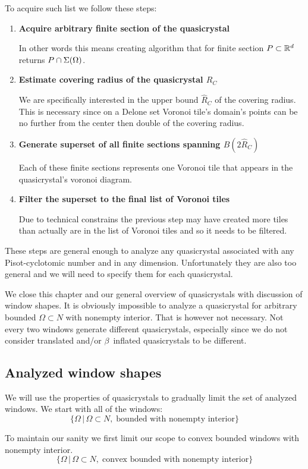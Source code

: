 \documentclass[text.tex]{subfiles}
\begin{document}
To acquire such list we follow these steps: 
\begin{enumerate}
\item \textbf{Acquire arbitrary finite section of the quasicrystal}

In other words this means creating algorithm that for finite section $P\subset\mathbb{R}^d$ returns $P\cap\Sigma(\Omega)$. 
\item \textbf{Estimate covering radius of the quasicrystal $R_C$}

We are specifically interested in the upper bound $\hat{R}_C$ of the covering radius. This is necessary since on a Delone set Voronoi tile's domain's points can be no further from the center then double of the covering radius. 
\item \textbf{Generate superset of all finite sections spanning $B(2\hat{R}_C)$}

Each of these finite sections represents one Voronoi tile that appears in the quasicrystal's voronoi diagram. 
\item \textbf{Filter the superset to the final list of Voronoi tiles}

Due to technical constrains the previous step may have created more tiles than actually are in the list of Voronoi tiles and so it needs to be filtered. 
\end{enumerate}

These steps are general enough to analyze any quasicrystal associated with any Pisot-cyclotomic number and in any dimension. Unfortunately they are also too general and we will need to specify them for each quasicrystal. 

We close this chapter and our general overview of quasicrystals with discussion of window shapes. It is obviously impossible to analyze a quasicrystal for arbitrary bounded $\Omega\subset N$ with nonempty interior. That is however not necessary. Not every two windows generate different quasicrystals, especially since we do not consider translated and/or $\beta$~inflated quasicrystals to be different. 

\subsection{Analyzed window shapes}
We will use the properties of quasicrystals to gradually limit the set of analyzed windows. We start with all of the windows: 
$$\big\{\Omega\,|\, \Omega\subset N ,\;\text{bounded with nonempty interior}\big\}$$

To maintain our sanity we first limit our scope to convex bounded windows with nonempty interior. 
$$\big\{\Omega\,|\, \Omega\subset N ,\;\text{convex bounded with nonempty interior}\big\}$$
\end{document}
